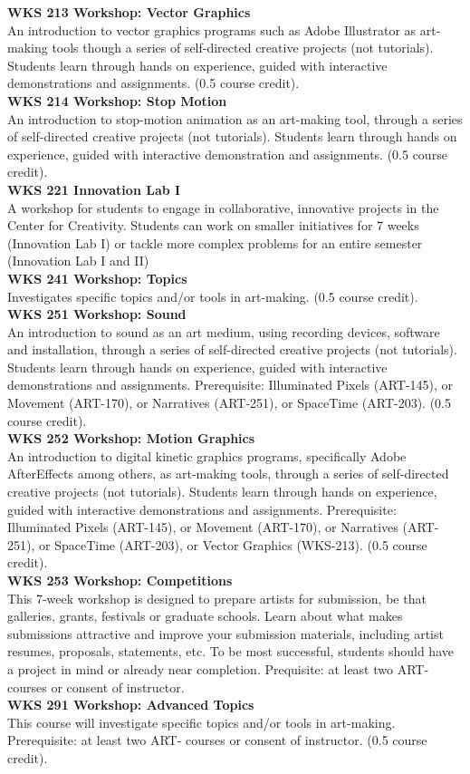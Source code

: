 \documentclass[
  letterpaper,
]{scrbook}
\begin{document}
\textbf{WKS 213 Workshop: Vector Graphics}\\
An introduction to vector graphics programs such as Adobe Illustrator as
art-making tools though a series of self-directed creative projects (not
tutorials). Students learn through hands on experience, guided with
interactive demonstrations and assignments. (0.5 course credit).\\
\textbf{WKS 214 Workshop: Stop Motion}\\
An introduction to stop-motion animation as an art-making tool, through
a series of self-directed creative projects (not tutorials). Students
learn through hands on experience, guided with interactive demonstration
and assignments. (0.5 course credit).\\
\textbf{WKS 221 Innovation Lab I}\\
A workshop for students to engage in collaborative, innovative projects
in the Center for Creativity. Students can work on smaller initiatives
for 7 weeks (Innovation Lab I) or tackle more complex problems for an
entire semester (Innovation Lab I and II)\\
\textbf{WKS 241 Workshop: Topics}\\
Investigates specific topics and/or tools in art-making. (0.5 course
credit).\\
\textbf{WKS 251 Workshop: Sound}\\
An introduction to sound as an art medium, using recording devices,
software and installation, through a series of self-directed creative
projects (not tutorials). Students learn through hands on experience,
guided with interactive demonstrations and assignments. Prerequisite:
Illuminated Pixels (ART-145), or Movement (ART-170), or Narratives
(ART-251), or SpaceTime (ART-203). (0.5 course credit).\\
\textbf{WKS 252 Workshop: Motion Graphics}\\
An introduction to digital kinetic graphics programs, specifically Adobe
AfterEffects among others, as art-making tools, through a series of
self-directed creative projects (not tutorials). Students learn through
hands on experience, guided with interactive demonstrations and
assignments. Prerequisite: Illuminated Pixels (ART-145), or Movement
(ART-170), or Narratives (ART-251), or SpaceTime (ART-203), or Vector
Graphics (WKS-213). (0.5 course credit).\\
\textbf{WKS 253 Workshop: Competitions}\\
This 7-week workshop is designed to prepare artists for submission, be
that galleries, grants, festivals or graduate schools. Learn about what
makes submissions attractive and improve your submission materials,
including artist resumes, proposals, statements, etc. To be most
successful, students should have a project in mind or already near
completion. Prequisite: at least two ART- courses or consent of
instructor.\\
\textbf{WKS 291 Workshop: Advanced Topics}\\
This course will investigate specific topics and/or tools in art-making.
Prerequisite: at least two ART- courses or consent of instructor. (0.5
course credit).
\end{document}
